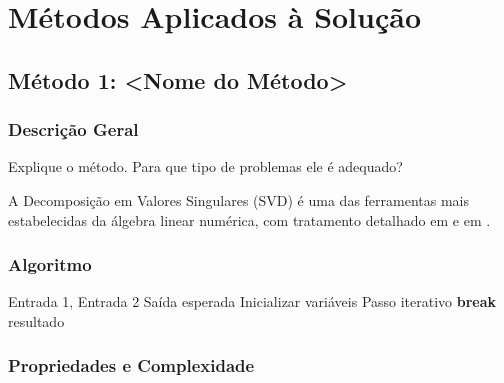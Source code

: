 \documentclass[12pt, a4paper]{article}
\begin{document}
\newpage

\section{Métodos Aplicados à Solução}
\label{sec:metodos}


\subsection{Método 1: <Nome do Método>}

\subsubsection{Descrição Geral}

Explique o método. Para que tipo de problemas ele é adequado?

A Decomposição em Valores Singulares (SVD) é uma das ferramentas mais
estabelecidas da álgebra linear numérica, com tratamento detalhado em
\textcite{golub2013matrix} e em \textcite{trefethen1997numerical}.

\subsubsection{Algoritmo}

\begin{algorithm}[H]
\caption{Nome do Algoritmo}
\label{alg:metodo1}
\begin{algorithmic}[1]
  \Require Entrada 1, Entrada 2
  \Ensure Saída esperada
  \State Inicializar variáveis
    \State Passo iterativo
      \State \textbf{break}
    \EndIf
  \EndFor
  \Return resultado
\end{algorithmic}
\end{algorithm}

\subsubsection{Propriedades e Complexidade}
\end{document}
